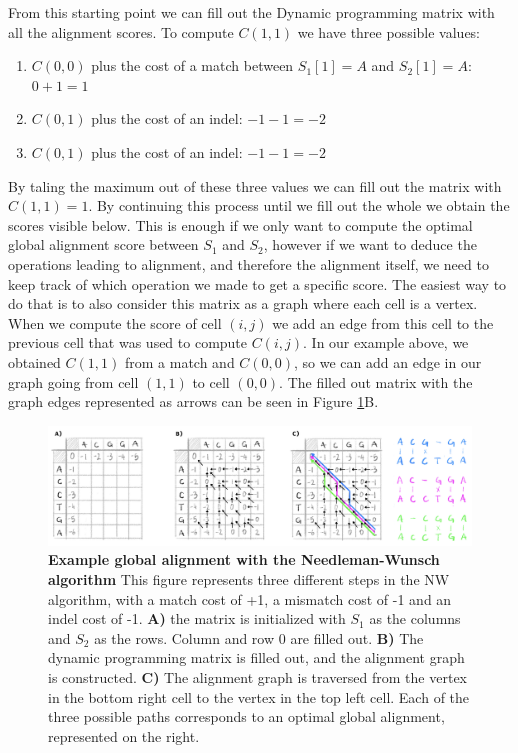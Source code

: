 \documentclass[
  11pt,
  twoside]{scrbook}
\providecommand{\tightlist}{%
  \setlength{\itemsep}{0pt}\setlength{\parskip}{0pt}}
\newcommand{\extcaption}[2]{
    \caption[#1]{
        \textbf{#1}\newline
        #2
    }
}
\begin{document}
From this starting point we can fill out the Dynamic programming matrix with all the alignment scores. To compute \(C(1,1)\) we have three possible values:

\begin{enumerate}
\def\labelenumi{\arabic{enumi}.}
\tightlist
\item
  \(C(0,0)\) plus the cost of a match between \(S_1[1]=A\) and \(S_2[1]=A\): \(0+1=1\)
\item
  \(C(0,1)\) plus the cost of an indel: \(-1 -1 = -2\)
\item
  \(C(0,1)\) plus the cost of an indel: \(-1-1=-2\)
\end{enumerate}

By taling the maximum out of these three values we can fill out the matrix with \(C(1,1)=1\). By continuing this process until we fill out the whole we obtain the scores visible below. This is enough if we only want to compute the optimal global alignment score between \(S_1\) and \(S_2\), however if we want to deduce the operations leading to alignment, and therefore the alignment itself, we need to keep track of which operation we made to get a specific score. The easiest way to do that is to also consider this matrix as a graph where each cell is a vertex. When we compute the score of cell \((i,j)\) we add an edge from this cell to the previous cell that was used to compute \(C(i,j)\). In our example above, we obtained \(C(1,1)\) from a match and \(C(0,0)\), so we can add an edge in our graph going from cell \((1,1)\) to cell \((0,0)\). The filled out matrix with the graph edges represented as arrows can be seen in Figure \ref{fig:nwAlign}B.

\begin{figure}[h]
\centering
\includegraphics[width=\linewidth]{./figures/Align-Intro/NW-total.png}
\extcaption{Example global alignment with the Needleman-Wunsch algorithm}{This figure represents three different steps in the NW algorithm, with a match cost of +1, a mismatch cost of -1 and an indel cost of -1. \textbf{A)} the matrix is initialized with $S_1$ as the columns and $S_2$ as the rows. Column and row 0 are filled out. \textbf{B)} The dynamic programming matrix is filled out, and the alignment graph is constructed. \textbf{C)} The alignment graph is traversed from the vertex in the bottom right cell to the vertex in the top left cell. Each of the three possible paths corresponds to an optimal global alignment, represented on the right.}
\label{fig:nwAlign}
\end{figure}
\end{document}
